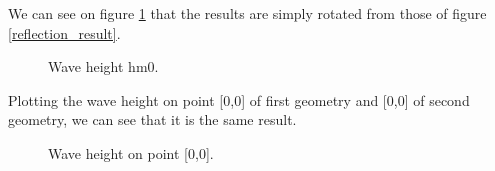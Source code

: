 We can see on figure \ref{reflection_result2} that the results are simply rotated from those of figure \ref{reflection_result}. 

\begin{figure} [!h]
\centering
{}
\caption{Wave height hm0.}
\label{reflection_result2}
\end{figure}

Plotting the wave height on point [0,0] of first geometry and [0,0] of second geometry, we can see that it is the same result.

\begin{figure} [!h]
\centering
{}
\caption{Wave height on point [0,0].}
\label{result_point0}
\end{figure}
